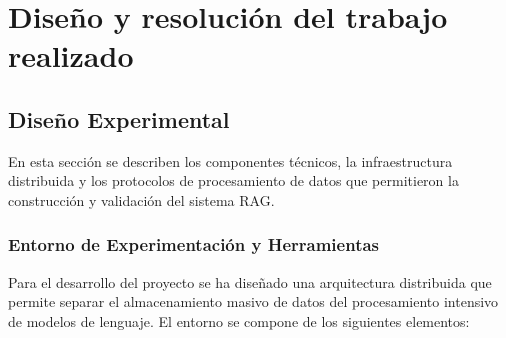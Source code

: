 

\chapter{Diseño y resolución del trabajo realizado}
\label{cap:diseño}
\section{Diseño Experimental}
En esta sección se describen los componentes técnicos, la infraestructura distribuida y los protocolos de procesamiento de datos que permitieron la construcción y validación del sistema RAG.

\subsection{Entorno de Experimentación y Herramientas}

Para el desarrollo del proyecto se ha diseñado una arquitectura distribuida que permite separar el almacenamiento masivo de datos del procesamiento intensivo de modelos de lenguaje. El entorno se compone de los siguientes elementos:

